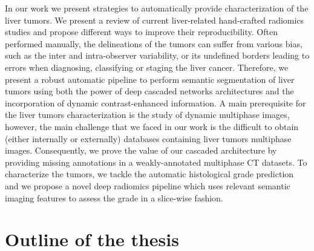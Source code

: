 In our work we present strategies to automatically provide characterization of the liver tumors.
We present a review of current liver-related hand-crafted radiomics studies and propose different ways to improve their reproducibility.
Often performed manually, the delineations of the tumors can suffer from various bias, such as the inter and intra-observer variability, or its undefined borders leading to errors when diagnosing, classifying or staging the liver cancer. Therefore, we present a robust automatic pipeline to perform semantic segmentation of liver tumors using both the power of deep cascaded networks architectures and the incorporation of dynamic contrast-enhanced information. A main prerequisite for the liver tumors characterization is the study of dynamic multiphase images, however, the main challenge that we faced in our work is the difficult to obtain (either internally or externally) databases containing liver tumors multiphase images. Consequently, we prove the value of our cascaded architecture by providing missing annotations in a weakly-annotated multiphase CT datasets.
To characterize the tumors, we tackle the automatic histological grade prediction and we propose a novel deep radiomics pipeline which uses relevant semantic imaging features to assess the grade in a slice-wise fashion.

\section*{Outline of the thesis}
\label{sec:Outline}

